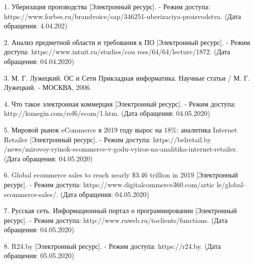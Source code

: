



1. Уберизация производства [Электронный ресурс]. - Режим доступа: https://www.forbes.ru/brandvoice/sap/346251-uberizaciya-proizvodstva. (Дата обращения: 4.04.202)

2. Анализ предметной области и требования к ПО [Электронный ресурс]. - Режим доступа: https://www.intuit.ru/studies/cou  \linebreak rses/64/64/lecture/1872. (Дата обращения: 04.04.2020)

3. М. Г. Лужецкий. ОС и Сети Прикладная информатика. Научные статьи /  М. Г. Лужецкий. - МОСКВА, 2006.

4. Что такое электронная коммерция [Электронный ресурс]. - Режим доступа: http://kunegin.com/ref6/ecom/1.htm. (Дата обращения: 04.05.2020)

5. Мировой рынок eCommerce в 2019 году вырос на 18\%: аналитика Internet Retailer [Электронный ресурс]. - Режим доступа: https://belretail.by \linebreak/news/mirovoy-ryinok-ecommerce-v-godu-vyiros-na-analitika-internet-retailer. \linebreak (Дата обращения: 04.05.2020)

6. Global ecommerce sales to reach nearly \$3.46 trillion in 2019 [Электронный ресурс]. - Режим доступа: https://www.digitalcommerce360.com/artic \linebreak le/global-ecommerce-sales/. (Дата обращения: 04.05.2020)

7. Русская сеть. Информационный портал о программировании [Электронный ресурс]. - Режим доступа: http://www.ruweb.ru/toclients/functions. (Дата обращения: 04.05.2020)

8. R24.by [Электронный ресурс]. - Режим доступа: https://r24.by. (Дата обращения: 05.05.2020)

